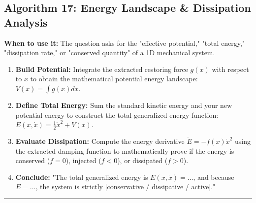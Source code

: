 \documentclass[11pt, a4paper]{report}
\begin{document}
\subsection*{Algorithm 17: Energy Landscape \& Dissipation Analysis}
\textbf{When to use it:} The question asks for the "effective potential," "total energy," "dissipation rate," or "conserved quantity" of a 1D mechanical system.
\begin{enumerate}[label=\textbf{\arabic*.}]
    \item \textbf{Build Potential:} Integrate the extracted restoring force $g(x)$ with respect to $x$ to obtain the mathematical potential energy landscape: $V(x) = \int g(x) dx$.
    \item \textbf{Define Total Energy:} Sum the standard kinetic energy and your new potential energy to construct the total generalized energy function: $E(x,\dot{x}) = \frac{1}{2}\dot{x}^2 + V(x)$.
    \item \textbf{Evaluate Dissipation:} Compute the energy derivative $\dot{E} = -f(x)\dot{x}^2$ using the extracted damping function to mathematically prove if the energy is conserved ($f=0$), injected ($f<0$), or dissipated ($f>0$).
    \item \textbf{Conclude:} "The total generalized energy is $E(x,\dot{x}) = \dots$, and because $\dot{E} = \dots$, the system is strictly [conservative / dissipative / active]."
\end{enumerate}
\vspace{1em}
\noindent\rule{\textwidth}{0.4pt}
\vspace{1em}
\end{document}

